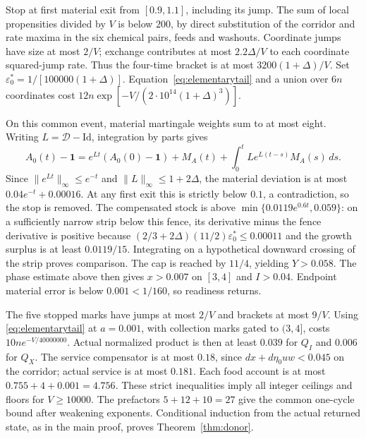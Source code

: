 \documentclass[11pt]{article}
\theoremstyle{definition}\newtheorem{definition}[theorem]{Definition}
\begin{document}
Stop at first material exit from $[0.9,1.1]$, including its jump.
The sum of local propensities divided by $V$ is below $200$, by direct substitution
of the corridor and rate maxima in the six chemical pairs, feeds and washouts.
Coordinate jumps have size at most $2/V$; exchange contributes at most
$2.2\Delta/V$ to each coordinate squared-jump rate. Thus the four-time bracket is
at most $3200(1+\Delta)/V$. Set $\varepsilon_0^*=1/[100000(1+\Delta)]$.
Equation~\eqref{eq:elementarytail} and a union over $6n$ coordinates cost
$12n\exp[-V/(2\cdot10^{14}(1+\Delta)^3)]$.

On this common event, material martingale weights sum to at most eight.
Writing $L=\mathcal D-\mathrm{Id}$, integration by parts gives
\[
A_0(t)-\mathbf1=e^{Lt}(A_0(0)-\mathbf1)+M_A(t)
 +\int_0^t Le^{L(t-s)}M_A(s)\,ds.
\]
Since $\|e^{Lt}\|_\infty\le e^{-t}$ and $\|L\|_\infty\le1+2\Delta$,
the material deviation is at most $0.04e^{-t}+0.00016$. At any first exit this
is strictly below $0.1$, a contradiction, so the stop is removed.
The compensated stock is above
$\min\{0.0119e^{0.6t},0.059\}$: on a sufficiently narrow strip below this
fence, its derivative minus the fence derivative is positive because
$(2/3+2\Delta)(11/2)\varepsilon_0^*\le0.00011$ and the growth surplus is
at least $0.0119/15$. Integrating on a hypothetical downward crossing of the
strip proves comparison. The cap is reached by $11/4$, yielding $Y>0.058$.
The phase estimate above then gives $x>0.007$ on $[3,4]$ and $I>0.04$.
Endpoint material error is below $0.001<1/160$, so readiness returns.

The five stopped marks have jumps at most $2/V$ and brackets at most $9/V$.
Using \eqref{eq:elementarytail} at $a=0.001$, with collection marks gated to
$(3,4]$, costs $10ne^{-V/40000000}$. Actual normalized product is then at least
$0.039$ for $Q_I$ and $0.006$ for $Q_X$. The service compensator is at most
$0.18$, since $d x+d\eta_0uw<0.045$ on the corridor; actual service is at most
$0.181$. Each food account is at most $0.755+4+0.001=4.756$.
These strict inequalities imply all integer ceilings and floors for $V\ge10000$.
The prefactors $5+12+10=27$ give the common one-cycle bound after weakening
exponents. Conditional induction from the actual returned state, as in the main
proof, proves Theorem~\ref{thm:donor}.



\end{document}
